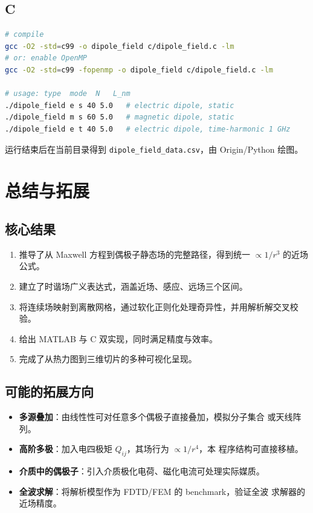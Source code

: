 \documentclass[11pt,a4paper]{article}
\begin{document}
\subsection{C}
\begin{lstlisting}[language=bash]
# compile
gcc -O2 -std=c99 -o dipole_field c/dipole_field.c -lm
# or: enable OpenMP
gcc -O2 -std=c99 -fopenmp -o dipole_field c/dipole_field.c -lm

# usage: type  mode  N   L_nm
./dipole_field e s 40 5.0   # electric dipole, static
./dipole_field m s 60 5.0   # magnetic dipole, static
./dipole_field e t 40 5.0   # electric dipole, time-harmonic 1 GHz
\end{lstlisting}
运行结束后在当前目录得到 \texttt{dipole\_field\_data.csv}，由 Origin/Python 绘图。

\section{总结与拓展}

\subsection{核心结果}
\begin{enumerate}
    \item 推导了从 Maxwell 方程到偶极子静态场的完整路径，得到统一
          $\propto 1/r^{3}$ 的近场公式。
    \item 建立了时谐场广义表达式，涵盖近场、感应、远场三个区间。
    \item 将连续场映射到离散网格，通过软化正则化处理奇异性，并用解析解交叉校验。
    \item 给出 MATLAB 与 C 双实现，同时满足精度与效率。
    \item 完成了从热力图到三维切片的多种可视化呈现。
\end{enumerate}

\subsection{可能的拓展方向}
\begin{itemize}
    \item \textbf{多源叠加}：由线性性可对任意多个偶极子直接叠加，模拟分子集合
          或天线阵列。
    \item \textbf{高阶多极}：加入电四极矩 $Q_{ij}$，其场行为 $\propto 1/r^{4}$，本
          程序结构可直接移植。
    \item \textbf{介质中的偶极子}：引入介质极化电荷、磁化电流可处理实际媒质。
    \item \textbf{全波求解}：将解析模型作为 FDTD/FEM 的 benchmark，验证全波
          求解器的近场精度。
\end{itemize}
\end{document}

